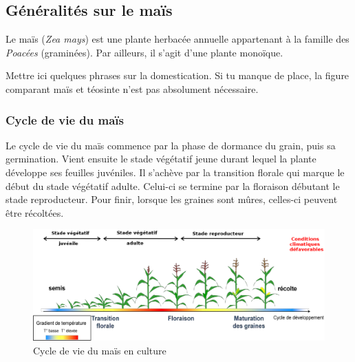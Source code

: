 \documentclass[12pt,a4paper]{report}
\newcommand{\com}[1]{{\noindent  \color{red}#1}}
\begin{document}
			\subsection{Généralités sur le maïs}
				Le maïs (\textit{Zea mays}) est une plante herbacée annuelle appartenant à la famille des \emph{Poacées} (graminées). Par ailleurs, il s'agit d'une plante monoïque.

\com{Mettre ici quelques phrases sur la domestication. Si tu manque de place, la figure comparant ma\"is et téosinte n'est pas absolument nécessaire.}				
				
				
				\subsubsection{Cycle de vie du maïs}
				Le cycle de vie du maïs commence par la phase de dormance du grain, puis sa germination. Vient ensuite le stade végétatif jeune durant lequel la plante développe ses feuilles juvéniles. Il s'achève par la transition florale qui marque le début du stade végétatif adulte. Celui-ci se termine par la floraison débutant le stade reproducteur. Pour finir, lorsque les graines sont mûres, celles-ci peuvent être récoltées.
				\begin{figure}[!h]
					\centering
					\includegraphics[width=13.7cm]{cycle.png}
					\caption{Cycle de vie du maïs en culture}
					\label{Cycle de vie du maïs en culture}
				\end{figure}
					
			
\end{document}
